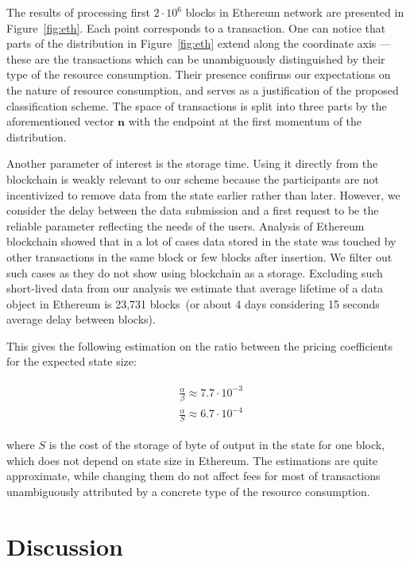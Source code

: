 \documentclass[]{llncs}   %
\newcommand{\authnote}[2]{\marginpar{\parbox{\marginparwidth}{\tiny %
  \textsf{#1 {\textcolor{blue}{notes: #2}}}}}%
  \textcolor{blue}{\textbf{\dag}}}
\newcommand{\authnote}[2]{
  \textsf{#1\textcolor{blue}{ #2}}}
\newcommand{\authnote}[2]{}
\newcommand{\dnote}[1]{{\authnote{\textcolor{red}{Dima notes:}}{#1}}}
\begin{document}
The results of processing first $2\cdot10^6$ blocks in Ethereum network are presented in Figure~\ref{fig:eth}. Each point corresponds to a transaction.  One can notice that parts of the distribution in Figure~\ref{fig:eth} extend
along the coordinate axis --- these are the transactions which can be
unambiguously distinguished by their type of the resource consumption. Their
presence confirms our expectations on the nature of resource consumption, and
serves as a justification of the proposed classification scheme. The space of
transactions is split into three parts by the aforementioned vector $\mathbf{n}$
with the endpoint at the first momentum of the distribution. \dnote{for transactions that are not on axises. How to write it?}

Another parameter of interest is the storage time. Using it directly
from the blockchain is weakly relevant to our scheme because the participants are not incentivized to remove data from the state earlier rather than later.
However, we consider the delay between the data submission and a first request to be the reliable parameter reflecting the needs of the users.
Analysis of Ethereum blockchain showed that in a lot of cases data stored in the state
was touched by other transactions in the same block or few blocks after insertion.
We filter out such cases as they do not show using blockchain as a storage. Excluding such short-lived data from our analysis
we estimate that average lifetime of a data object in Ethereum is 23,731 blocks~(or about 4 days
considering 15 seconds average delay between blocks).

This gives the following estimation on the ratio between the pricing coefficients for the expected state size:

\begin{align}
\begin{split}
&\frac{\alpha}{\beta} \approx 7.7\cdot10^{-3} \\
&\frac{\alpha}{S} \approx 6.7\cdot10^{-4}
\end{split}
\end{align}

where $S$ is the cost of the storage of byte of output in the state for one block, which does
not depend on state size in Ethereum. The estimations are quite approximate, while changing
them do not affect fees for most of transactions unambiguously attributed by a concrete type of the resource consumption.

\section{Discussion}
\label{sec:conslusion}
\end{document}
